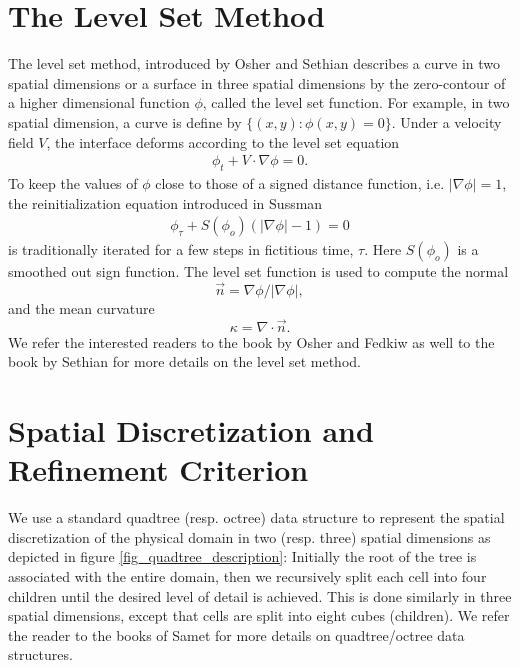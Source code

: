 \documentclass[english]{article}
\begin{document}
\section{The Level Set Method}
The level set method, introduced by Osher and Sethian
\cite{osher:1988:originallevelset} describes a curve in two spatial
dimensions or a surface in three spatial dimensions by the zero-contour of
a higher dimensional function $\phi$, called the level set function. For
example, in two spatial dimension, a curve is define by $\{(x, y):
\phi(x,y)=0\}$. Under a velocity field $V$, the interface deforms according
to the level set equation
\begin{eqnarray}
\phi_t+V \cdot \nabla \phi = 0. \label{eq_levelset}
\end{eqnarray}
To keep the values of $ \phi $ close to those of a signed distance
function, i.e. $ |\nabla \phi| = 1 $, the reinitialization equation
introduced in Sussman \etal \cite{Sussman:1994:levelsetincompressible}
\begin{eqnarray}
\phi_{\tau} + S(\phi_o) \left( |\nabla \phi| - 1 \right) =0 \label{reinit}
\end{eqnarray}
is traditionally iterated for a few steps in fictitious time, $ \tau $.
Here $S(\phi_o)$ is a smoothed out sign function. The level set function is
used to compute the normal $$ \vec{n} = \nabla \phi/|\nabla \phi|, $$ and
the mean curvature $$\kappa = \nabla \cdot \vec{n}. $$ We refer the
interested readers to the book by Osher and Fedkiw
\cite{osher:2002:levelset} as well to the book by Sethian
\cite{sethian:1999:levelset} for more details on the level set method.

%
%
\section{Spatial Discretization and Refinement Criterion \label{sec_spatial_discretization}}

We use a standard quadtree (resp. octree) data structure to represent the
spatial discretization of the physical domain in two (resp. three) spatial
dimensions as depicted in figure \ref{fig_quadtree_description}: Initially
the root of the tree is associated with the entire domain, then we
recursively split each cell into four children until the desired level of
detail is achieved. This is done similarly in three spatial dimensions,
except that cells are split into eight cubes (children). We refer the
reader to the books of Samet \cite{Samet:1990:AOS,Samet:1989:TDA} for more
details on quadtree/octree data structures.
\end{document}
